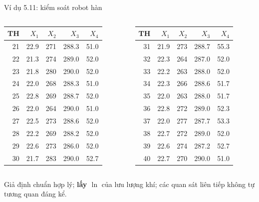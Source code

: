\begin{frame}{Ví dụ 5.11: kiểm soát robot hàn}
{\begin{columns}[T]
\begin{tabular}{rrrrr}
    \toprule
    TH & \(X_1\) & \(X_2\) & \(X_3\) & \(X_4\) \\
    \midrule
21 & 22.9 & 271 & 288.3 & 51.0 \\
22 & 21.3 & 274 & 289.0 & 52.0 \\
23 & 21.8 & 280 & 290.0 & 52.0 \\
24 & 22.0 & 268 & 288.3 & 51.0 \\
25 & 22.8 & 269 & 288.7 & 52.0 \\
26 & 22.0 & 264 & 290.0 & 51.0 \\
27 & 22.5 & 273 & 288.6 & 52.0 \\
28 & 22.2 & 269 & 288.2 & 52.0 \\
29 & 22.6 & 273 & 286.0 & 52.0 \\
30 & 21.7 & 283 & 290.0 & 52.7 \\
    \bottomrule
    \end{tabular}
    \centering
    \begin{tabular}{rrrrr}
    \toprule
    TH & \(X_1\) & \(X_2\) & \(X_3\) & \(X_4\) \\
    \midrule
31 & 21.9 & 273 & 288.7 & 55.3 \\
32 & 22.3 & 264 & 287.0 & 52.0 \\
33 & 22.2 & 263 & 288.0 & 52.0 \\
34 & 22.3 & 266 & 288.6 & 51.7 \\
35 & 22.0 & 263 & 288.0 & 51.7 \\
36 & 22.8 & 272 & 289.0 & 52.3 \\
37 & 22.0 & 277 & 287.7 & 53.3 \\
38 & 22.7 & 272 & 289.0 & 52.0 \\
39 & 22.6 & 274 & 287.2 & 52.7 \\
40 & 22.7 & 270 & 290.0 & 51.0 \\
    \bottomrule
    \end{tabular}
  \end{columns}}

  \smallskip
  {\footnotesize Giả định chuẩn hợp lý; \textbf{lấy \(\ln\)} của lưu lượng khí; các quan sát liên tiếp không tự tương quan đáng kể.}
\end{frame}

